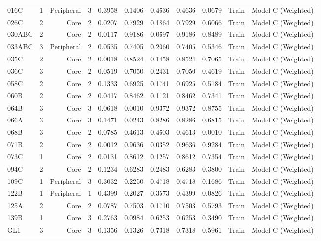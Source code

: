 {\begin{longtable}{lrrrrrrrrrr}
  016C & 1 & Peripheral & 3 & 0.3958 & 0.1406 & 0.4636 & 0.4636 & 0.0679 & Train & Model C (Weighted) \\
  026C & 2 & Core & 2 & 0.0207 & 0.7929 & 0.1864 & 0.7929 & 0.6066 & Train & Model C (Weighted) \\
  030ABC & 2 & Core & 2 & 0.0117 & 0.9186 & 0.0697 & 0.9186 & 0.8489 & Train & Model C (Weighted) \\
  033ABC & 3 & Peripheral & 2 & 0.0535 & 0.7405 & 0.2060 & 0.7405 & 0.5346 & Train & Model C (Weighted) \\
  035C & 2 & Core & 2 & 0.0018 & 0.8524 & 0.1458 & 0.8524 & 0.7065 & Train & Model C (Weighted) \\
  036C & 3 & Core & 2 & 0.0519 & 0.7050 & 0.2431 & 0.7050 & 0.4619 & Train & Model C (Weighted) \\
  058C & 2 & Core & 2 & 0.1333 & 0.6925 & 0.1741 & 0.6925 & 0.5184 & Train & Model C (Weighted) \\
  060B & 2 & Core & 2 & 0.0417 & 0.8462 & 0.1121 & 0.8462 & 0.7341 & Train & Model C (Weighted) \\
  064B & 3 & Core & 3 & 0.0618 & 0.0010 & 0.9372 & 0.9372 & 0.8755 & Train & Model C (Weighted) \\
  066A & 3 & Core & 3 & 0.1471 & 0.0243 & 0.8286 & 0.8286 & 0.6815 & Train & Model C (Weighted) \\
  068B & 3 & Core & 2 & 0.0785 & 0.4613 & 0.4603 & 0.4613 & 0.0010 & Train & Model C (Weighted) \\
  071B & 2 & Core & 2 & 0.0012 & 0.9636 & 0.0352 & 0.9636 & 0.9284 & Train & Model C (Weighted) \\
  073C & 1 & Core & 2 & 0.0131 & 0.8612 & 0.1257 & 0.8612 & 0.7354 & Train & Model C (Weighted) \\
  094C & 2 & Core & 2 & 0.1234 & 0.6283 & 0.2483 & 0.6283 & 0.3800 & Train & Model C (Weighted) \\
  109C & 1 & Peripheral & 3 & 0.3032 & 0.2250 & 0.4718 & 0.4718 & 0.1686 & Train & Model C (Weighted) \\
  122B & 1 & Peripheral & 1 & 0.4399 & 0.2027 & 0.3573 & 0.4399 & 0.0826 & Train & Model C (Weighted) \\
  125A & 2 & Core & 2 & 0.0787 & 0.7503 & 0.1710 & 0.7503 & 0.5793 & Train & Model C (Weighted) \\
  139B & 1 & Core & 3 & 0.2763 & 0.0984 & 0.6253 & 0.6253 & 0.3490 & Train & Model C (Weighted) \\
  GL1 & 3 & Core & 3 & 0.1356 & 0.1326 & 0.7318 & 0.7318 & 0.5961 & Train & Model C (Weighted) \\

\end{longtable}}
